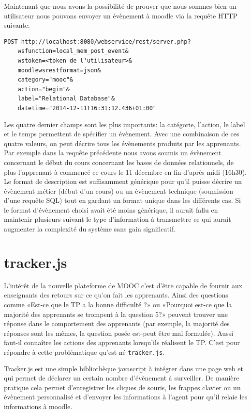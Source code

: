 \documentclass[a4paper,11pt]{report}
\begin{document}
Maintenant que nous avons la possibilité de prouver que nous sommes bien un utilisateur nous pouvons envoyer un évènement à moodle via la requête HTTP suivante:

\begin{lstlisting}[caption={Soumet un évènement}]
POST http://localhost:8080/webservice/rest/server.php?
    wsfunction=local_mem_post_event&
    wstoken=<token de l'utilisateur>&
    moodlewsrestformat=json&
    category="mooc"&
    action="begin"&
    label="Relational Database"&
    datetime="2014-12-11T16:31:12.436+01:00"
\end{lstlisting}

Les quatre dernier champs sont les plus importants: la catégorie, l'action, le label et le temps permettent de spécifier un évènement. Avec une combinaison de ces quatre valeurs, on peut décrire tous les évènements produits par les apprenants. Par exemple dans la requête précédente nous avons soumis un évènement concernant le début du cours concernant les bases de données relationnels, de plus l'apprenant à commencé ce cours le 11 décembre en fin d'après-midi (16h30).
Le format de description est suffisamment générique pour qu'il puisse décrire un évènement métier (début d'un cours) ou un évènement technique (soumission d'une requête SQL) tout en gardant un format unique dans les différents cas. Si le format d'évènement choisi avait été moins générique, il aurait fallu en maintenir plusieurs suivant le type d'information à transmettre ce qui aurait augmenter la complexité du système sans gain significatif.

\section{tracker.js}

L'intérêt de la nouvelle plateforme de MOOC c'est d'être capable de fournir aux enseignants des retours sur ce qu'on fait les apprenants. Ainsi des questions comme «Est-ce que le TP a la bonne difficulté ?» ou «Pourquoi est-ce que la majorité des apprenants se trompent à la question 5?» peuvent trouver une réponse dans le comportement des apprenants (par exemple, la majorité des réponses sont les mêmes, la question posée est-peut être mal formulée). Aussi faut-il connaître les actions des apprenants lorsqu'ils réalisent le TP.
C'est pour répondre à cette problématique qu'est né \texttt{tracker.js}.

Tracker.js est une simple bibliothèque javascript à intégrer dans une page web et qui permet de déclarer un certain nombre d'évènement à surveiller.
De manière pratique cela permet d'enregistrer les cliques de souris, les frappes clavier ou un évènement personnalisé et d'envoyer les informations à l'agent pour qu'il relaie les informations à moodle.
\end{document}
